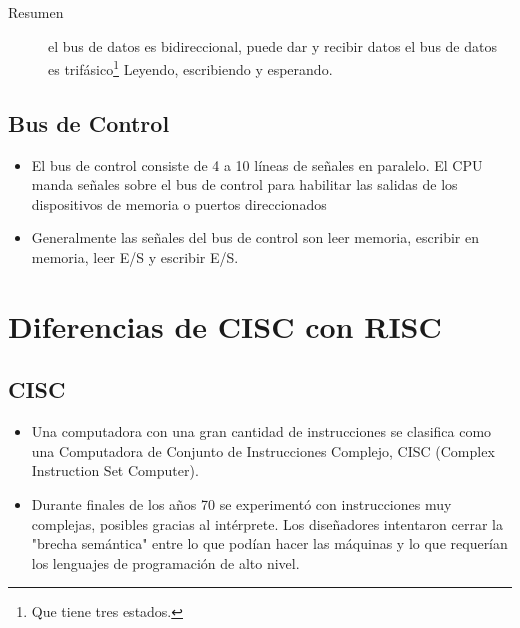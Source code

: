 \documentclass[11pt]{article}
\begin{document}
\begin{description}
\item[{Resumen}] el bus de datos es bidireccional, puede dar y recibir datos el bus de datos es trifásico\footnote{Que tiene tres estados.} Leyendo, escribiendo y esperando.
\end{description}

\subsection{Bus de Control}
\label{sec:orgc54395b}
\begin{itemize}
\item El bus de control consiste de 4 a 10 líneas de señales en paralelo. El CPU manda señales sobre el bus de control para habilitar las salidas de los dispositivos de memoria o puertos direccionados

\item Generalmente las señales del bus de control son leer memoria, escribir en memoria, leer E/S y escribir E/S.
\end{itemize}

\section{Diferencias de CISC con RISC}
\label{sec:org149842c}
\subsection{CISC}
\label{sec:org117d22b}
\begin{itemize}
\item Una computadora con una gran cantidad de instrucciones se clasifica como una Computadora de Conjunto de Instrucciones Complejo, CISC (Complex Instruction Set Computer).

\item Durante finales de los años 70 se experimentó con instrucciones muy complejas, posibles gracias al intérprete. Los diseñadores intentaron cerrar la "brecha semántica" entre lo que podían hacer las máquinas y lo que requerían los lenguajes de programación de alto nivel.
\end{itemize}
\end{document}
